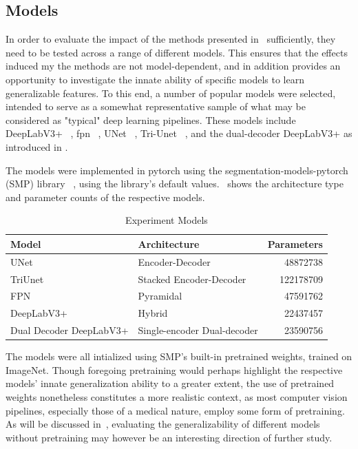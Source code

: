 \subsection{Models} \label{model_choices}
In order to evaluate the impact of the methods presented in~ sufficiently, they need to be tested across a range of different models. This ensures that the effects induced my the methods are not model-dependent, and in addition provides an opportunity to investigate the innate ability of specific models to learn generalizable features. To this end, a number of popular models were selected, intended to serve as a somewhat representative sample of what may be considered as "typical" deep learning pipelines. These models include DeepLabV3+ ~\cite{deeplab}, \gls{fpn} ~\cite{fpn}, UNet ~\cite{unet}, Tri-Unet ~\cite{divergentnets}, and the dual-decoder DeepLabV3+ as introduced in . 

The models were implemented in pytorch using the segmentation-models-pytorch (SMP) library ~\cite{smp}, using the library's default values.~ shows the architecture type and parameter counts of the respective models. 
  \begin{table}[htb]
            \centering
            \begin{tabularx}{\linewidth}{lXr}
            \toprule
                 Model & Architecture & Parameters  \\
            \midrule
                 UNet ~\cite{unet} & Encoder-Decoder & 48872738\\ 
                 TriUnet ~\cite{divergentnets} &
                 Stacked Encoder-Decoder & 122178709\\
                 FPN ~\cite{fpn} & Pyramidal & 47591762\\ 
                 DeepLabV3+ ~\cite{deeplab} & Hybrid & 22437457\\ 
                 Dual Decoder DeepLabV3+& Single-encoder Dual-decoder & 23590756\\
            \bottomrule
            \end{tabularx}
            \caption{Experiment Models}
            \label{tab:baselines}
        \end{table}
The models were all intialized using SMP's built-in pretrained weights, trained on ImageNet. Though foregoing pretraining would perhaps highlight the respective models' innate generalization ability to a greater extent, the use of pretrained weights nonetheless constitutes a more realistic context, as most computer vision pipelines, especially those of a medical nature, employ some form of pretraining. As will be discussed in~, evaluating the generalizability of different models without pretraining may however be an interesting direction of further study. 
 

